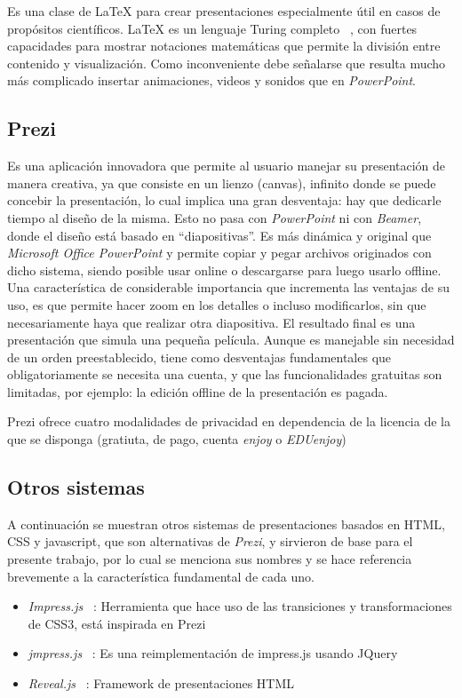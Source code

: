 			Es una clase de \LaTeX{} para crear presentaciones especialmente útil en casos de propósitos científicos. \LaTeX{} es un lenguaje Turing completo ~\cite{turing}, con fuertes capacidades para mostrar notaciones matemáticas que permite la división entre contenido y visualización. Como inconveniente debe señalarse que resulta mucho más complicado insertar animaciones, videos y sonidos que en \textit{PowerPoint}.


		\subsection{Prezi} %
		\label{sub:prezi}

			Es una aplicación innovadora que permite al usuario manejar su presentación de manera creativa, ya que consiste en un lienzo (canvas), infinito donde se puede concebir la presentación, lo cual implica una gran desventaja: hay que dedicarle tiempo al diseño de la misma. Esto no pasa con \textit{PowerPoint} ni con \textit{Beamer}, donde el diseño está basado en ``diapositivas''. Es más dinámica y original que \textit{Microsoft Office PowerPoint} y permite copiar y pegar archivos originados con dicho sistema, siendo posible usar online o descargarse para luego usarlo offline.  Una característica de considerable importancia que incrementa las ventajas de su uso, es que permite hacer zoom en los detalles o incluso modificarlos, sin que necesariamente haya que realizar otra diapositiva. El resultado final es una presentación que simula una pequeña película. Aunque es manejable sin necesidad de un orden preestablecido, tiene como desventajas fundamentales que obligatoriamente se necesita una cuenta, y que las funcionalidades gratuitas son limitadas, por ejemplo: la edición offline de la presentación es pagada.

			Prezi ofrece cuatro modalidades de privacidad en dependencia de la licencia de la que se disponga (gratiuta, de pago, cuenta \textit{enjoy} o \textit{EDUenjoy})		


		\subsection{Otros sistemas} %
		\label{sub:otros_sistemas}
			A continuación se muestran otros sistemas de presentaciones basados en HTML, CSS y javascript, que son alternativas de \textit{Prezi}, y sirvieron de base para el presente trabajo, por lo cual se menciona sus nombres y se hace referencia brevemente a la característica fundamental de cada uno.
			\begin{itemize}
				\item \textit{Impress.js} ~\cite{impress}: Herramienta que hace uso de las transiciones y transformaciones de CSS3, está inspirada en Prezi
				\item \textit{jmpress.js} ~\cite{jmpress}: Es una reimplementación de impress.js usando JQuery
				\item \textit{Reveal.js} ~\cite{reveal}: Framework de presentaciones HTML
			\end{itemize}
	
